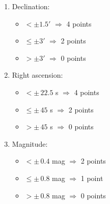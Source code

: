 \begin{enumerate}
\item Declination:
  \begin{itemize}
  \item[(a)] $< \pm 1.5'$ $\Longrightarrow$ 4 points
  \item[(b)] $\le \pm 3'$ $\Longrightarrow$ 2 points
  \item[(c)] $> \pm 3'$ $\Longrightarrow$ 0 points
  \end{itemize}
\item Right ascension:
  \begin{itemize}
  \item[(a)] $< \pm\,22.5$ s $\Longrightarrow$ 4 points
  \item[(b)] $\le \pm\,45$ s $\Longrightarrow$ 2 points
  \item[(c)] $> \pm\,45$ s $\Longrightarrow$ 0 points
  \end{itemize}
\item Magnitude:
  \begin{itemize}
  \item[(a)] $< \pm\,0.4$ mag $\Longrightarrow$ 2 points
  \item[(b)] $\le \pm\,0.8$ mag $\Longrightarrow$ 1 point
  \item[(c)] $> \pm\,0.8$ mag $\Longrightarrow$ 0 points
  \end{itemize}
\end{enumerate}
